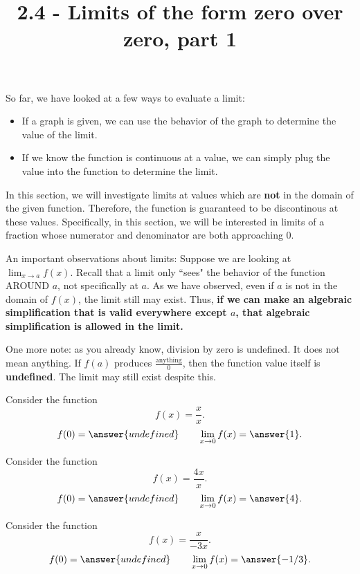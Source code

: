 \documentclass{ximera}
\title{2.4 - Limits of the form zero over zero, part 1}
\begin{document}
\begin{abstract}
\end{abstract}
\maketitle

So far, we have looked at a few ways to evaluate a limit:

\begin{itemize}
\item If a graph is given, we can use the behavior of the graph to determine the value of the limit.
\item If we know the function is continuous at a value, we can simply plug the value into the function to determine the limit.
\end{itemize}

In this section, we will investigate limits at values which are \textbf{not} in the domain of the given function. Therefore, the function is guaranteed to be discontinous at these values. Specifically, in this section, we will be interested in limits of a fraction whose numerator and denominator are both approaching $0$.

An important observations about limits: Suppose we are looking at $\displaystyle \lim_{x\to a} f(x)$. Recall that a limit only ``sees" the behavior of the function AROUND $a$, not specifically at $a$. As we have observed, even if $a$ is not in the domain of $f(x)$, the limit still may exist. Thus, \textbf{if we can make an algebraic simplification that is valid everywhere except $a$, that algebraic simplification is allowed in the limit.}

One more note: as you already know, division by zero is undefined. It does not mean anything. If $f(a)$ produces $\displaystyle \frac{\text{anything}}{0}$, then the function value itself is \textbf{undefined}. The limit may still exist despite this.

\begin{problem}
  Consider the function
  \[
  f(x) = \frac{x}{x}.
  \]
  \[
  f(0) = \answer{undefined}\qquad\lim_{x\to 0} f(x) = \answer{1}.
  \]
\end{problem}

\begin{problem}
  Consider the function
  \[
  f(x) = \frac{4x}{x}.
  \]
  \[
  f(0) = \answer{undefined}\qquad\lim_{x\to 0} f(x) = \answer{4}.
  \]
\end{problem}

\begin{problem}
  Consider the function
  \[
  f(x) = \frac{x}{-3x}.
  \]
  \[
  f(0) = \answer{undefined}\qquad\lim_{x\to 0} f(x) = \answer{-1/3}.
  \]
\end{problem}
\end{document}
